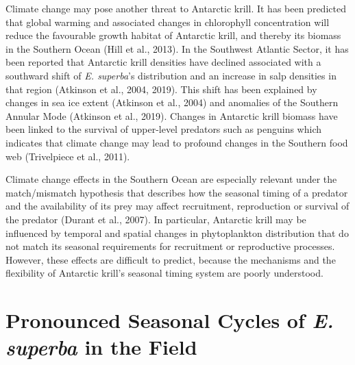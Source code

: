 Climate change may pose another threat to Antarctic krill. It has been
predicted that global warming and associated changes in chlorophyll
concentration will reduce the favourable growth habitat of Antarctic krill, and
thereby its biomass in the Southern Ocean (Hill et al., 2013). In the Southwest
Atlantic Sector, it has been reported that Antarctic krill densities have
declined associated with a southward shift of \textit{E. superba}'s
distribution and an increase in salp densities in that region (Atkinson et al.,
2004, 2019). This shift has been explained by changes in sea ice extent
(Atkinson et al., 2004) and anomalies of the Southern Annular Mode (Atkinson et
al., 2019). Changes in Antarctic krill biomass have been linked to the survival
of upper-level predators such as penguins which indicates that climate change
may lead to profound changes in the Southern food web (Trivelpiece et al.,
2011).

Climate change effects in the Southern Ocean are especially relevant under the
match/mismatch hypothesis that describes how the seasonal timing of a predator
and the availability of its prey may affect recruitment, reproduction or
survival of the predator (Durant et al., 2007). In particular, Antarctic krill
may be influenced by temporal and spatial changes in phytoplankton distribution
that do not match its seasonal requirements for recruitment or reproductive
processes. However, these effects are difficult to predict, because the
mechanisms and the flexibility of Antarctic krill's seasonal timing system are
poorly understood.

\section*{Pronounced Seasonal Cycles of \textit{E. superba} in the Field}


